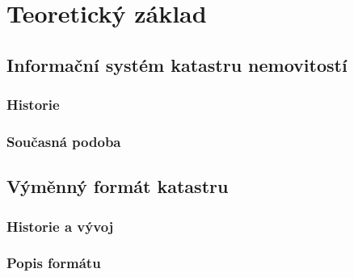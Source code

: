 \chapter{Teoretický základ}
\label{2-teorie}


\section{Informační systém katastru nemovitostí}

\subsection{Historie}
\subsection{Současná podoba}

\section{Výměnný formát katastru}
\subsection{Historie a vývoj}
\subsection{Popis formátu}